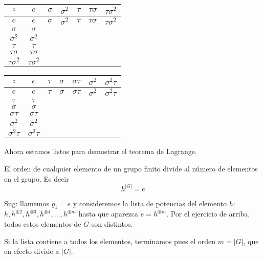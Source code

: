 \begin{center}
\begin{tabular}{|c||c|c|c|c|c|c|} 
 \hline
  $\circ$ & $e$ & $\sigma$ & $\sigma^2$ & $\tau$ & $\tau\sigma$ & $\tau\sigma^2$ \\ 
  \hline
  \hline
$e$ & $e$ & $\sigma$ & $\sigma^2$ & $\tau$ & $\tau\sigma$ & $\tau\sigma^2$ \\
  \hline
$\sigma$ & $\sigma$ &  &  &  &  & \\
  \hline
$\sigma^2$ & $\sigma^2$ &  &  &  &  & \\
  \hline
$\tau$ & $\tau$ &  &  &  &  & \\
  \hline
$\tau\sigma$ & $\tau\sigma$ &  &  &  &  & \\
  \hline  
$\tau\sigma^2$ & $\tau\sigma^2$ &  &  &  &  & \\
    \hline
  \end{tabular}
\hspace{2cm}
\begin{tabular}{|c||c|c|c|c|c|c|} 
 \hline
  $\circ$ & $e$ & $\tau$ & $\sigma$ & $\sigma\tau$ & $\sigma^2$ & $\sigma^2\tau$ \\ 
  \hline
  \hline
$e$ & $e$ & $\tau$ & $\sigma$ & $\sigma\tau$ & $\sigma^2$ & $\sigma^2\tau$ \\
  \hline
$\tau$ & $\tau$ &  &  &  &  & \\
  \hline
$\sigma$ & $\sigma$ &  &  &  &  & \\
  \hline
$\sigma\tau$ & $\sigma\tau$ &  &  &  &  & \\
  \hline
$\sigma^2$ & $\sigma^2$ &  &  &  &  & \\
  \hline  
$\sigma^2\tau$ & $\sigma^2\tau$ &  &  &  &  & \\
    \hline
  \end{tabular}
\end{center}

Ahora estamos listos para demostrar el teorema de Lagrange.

\begin{teorema}
El orden de cualquier elemento de un grupo finito divide al número de elementos en el grupo. Es decir $$h^{|G|}=e$$  
\end{teorema}
Sug: llamemos $g_1=e$ y consideremos la lista de potencias del elemento $h$: $h, h^{\circledast 2}, h^{\circledast 3}, h^{\circledast 4}, \dots, h^{\circledast m}$ hasta que aparezca $e=h^{\circledast m}$. Por el ejercicio de arriba, todos estos elementos de $G$ son distintos.

Si la lista contiene a todos los elementos, terminamos pues el orden $m=|G|$, que en efecto divide a $|G|$.

